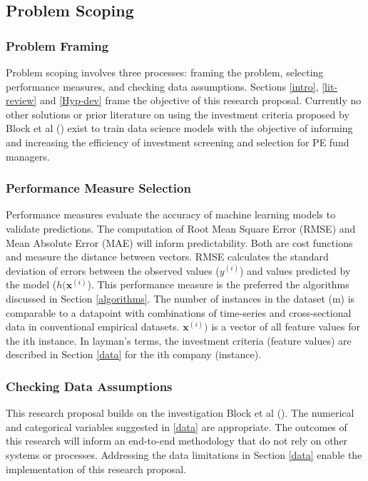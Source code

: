 \documentclass[12pt]{article}
\begin{document}
\subsection{Problem Scoping} \label{method-prob-solv}
\subsubsection{Problem Framing}
Problem scoping involves three processes: framing the problem, selecting performance measures, and checking data assumptions.
Sections \ref{intro}, \ref{lit-review} and \ref{Hyp-dev} frame the objective of this research proposal.
Currently no other solutions or prior literature on using the investment criteria proposed by Block et al (\citeyear{BLOCK2019329}) exist
to train data science models with the objective of informing and increasing the efficiency of investment screening and selection for PE fund managers.
\subsubsection{Performance Measure Selection} \label{perf-meas}
Performance measures evaluate the accuracy of machine learning models to validate predictions.
The computation of Root Mean Square Error (RMSE) and Mean Absolute Error (MAE) will inform predictability.
Both are cost functions and measure the distance between vectors.
RMSE calculates the standard deviation of errors between the observed values ($y^{(i)}$) and values predicted by the model ($h(\textbf{x}^{(i)}$). 
This performance measure is the preferred the algorithms discussed in Section \ref{algorithms}.
The number of instances in the dataset (m) is comparable to a datapoint with combinations of time-series and cross-sectional data in conventional empirical datasets.
$\textbf{x}^{(i)})$ is a vector of all feature values for the ith instance.
In layman's terms, the investment criteria (feature values) are described in Section \ref{data} for the ith company (instance).
\subsubsection{Checking Data Assumptions}
This research proposal builds on the investigation Block et al (\citeyear{BLOCK2019329}).
The numerical and categorical variables suggested in \ref{data} are appropriate. 
The outcomes of this research will inform an end-to-end methodology that do not rely on other systems or processes.
Addressing the data limitations in Section \ref{data} enable  the implementation of this research proposal.
\end{document}
